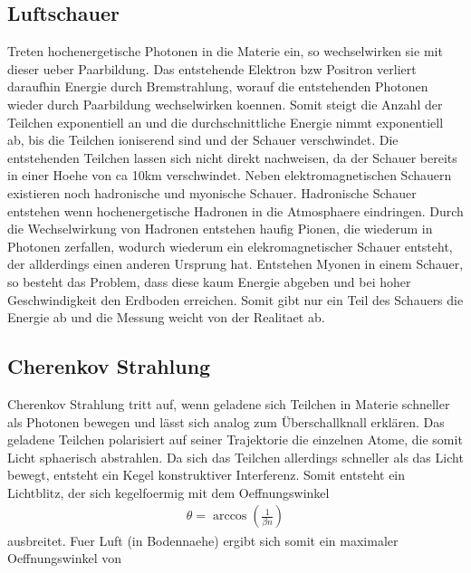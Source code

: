 \subsection{Luftschauer}
Treten hochenergetische Photonen in die Materie ein, so wechselwirken sie mit dieser ueber Paarbildung. Das entstehende Elektron bzw Positron verliert daraufhin Energie durch Bremstrahlung, worauf die entstehenden Photonen wieder durch Paarbildung wechselwirken koennen. Somit steigt die Anzahl der Teilchen exponentiell an und die durchschnittliche Energie nimmt exponentiell ab, bis die Teilchen ioniserend sind und der Schauer verschwindet. Die entstehenden Teilchen lassen sich nicht direkt nachweisen, da der Schauer bereits in einer Hoehe von ca 10km verschwindet. %
Neben elektromagnetischen Schauern existieren noch hadronische und myonische Schauer. Hadronische Schauer entstehen wenn hochenergetische Hadronen in die Atmosphaere eindringen. Durch die Wechselwirkung von Hadronen entstehen haufig Pionen, die wiederum in Photonen zerfallen, wodurch wiederum ein elekromagnetischer Schauer entsteht, der allderdings einen anderen Ursprung hat. Entstehen Myonen in einem Schauer, so besteht das Problem, dass diese kaum Energie abgeben und bei hoher Geschwindigkeit den Erdboden erreichen. Somit gibt nur ein Teil des Schauers die Energie ab und die Messung weicht von der Realitaet ab.

\subsection{Cherenkov Strahlung}
Cherenkov Strahlung tritt auf, wenn geladene sich Teilchen in Materie schneller als Photonen bewegen und lässt sich analog zum Überschallknall erklären. Das geladene Teilchen polarisiert auf seiner Trajektorie die einzelnen Atome, die somit Licht sphaerisch abstrahlen. Da sich das Teilchen allerdings schneller als das Licht bewegt, entsteht ein Kegel konstruktiver Interferenz. Somit entsteht ein Lichtblitz, der sich kegelfoermig mit dem Oeffnungswinkel %
\begin{align}
\theta = \arccos\left(\frac{1}{\beta n}\right)
\end{align}
ausbreitet. Fuer Luft (in Bodennaehe) ergibt sich somit ein maximaler Oeffnungswinkel von

